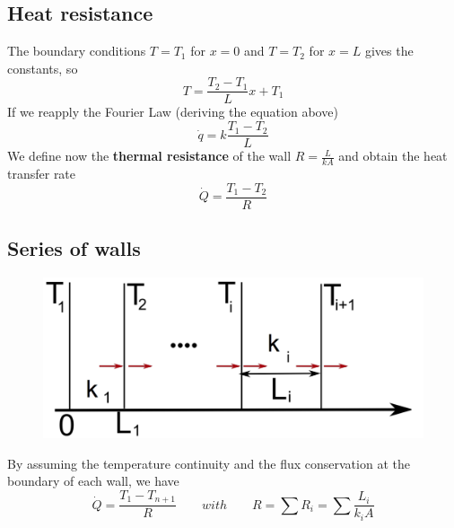  			\subsection{Heat resistance}
	 			The boundary conditions $T =T_1$ for $x = 0$ and $T=T_2$ for $x=L$ gives the constants, so
 				\begin{equation}
 					T = \frac{T_2-T_1}{L}x + T_1
 				\end{equation}
 				If we reapply the Fourier Law (deriving the equation above) 
 				\begin{equation}
	 				\dot{q} = k\frac{T_1 -T_2}{L}
 				\end{equation}
 				We define now the \textbf{thermal resistance} of the wall $R = \frac{L}{kA}$ and obtain the heat transfer rate 
 				\begin{equation}
 					\dot{Q} = \frac{T_1 - T_2}{R}
 				\end{equation}
 				
 			\subsection{Series of walls}
 				\begin{figure}
 				\vspace{-5mm}
 				\includegraphics[scale=0.2]{ch3/6}
 				\end{figure}
 				By assuming the temperature continuity and the flux conservation at the boundary of each wall, we have 
 				\begin{equation}
 					\dot{Q} = \frac{T_1-T_{n+1}}{R} \qquad with \qquad R =\sum R_i = \sum \frac{L_i}{k_iA}
 				\end{equation}
 				
